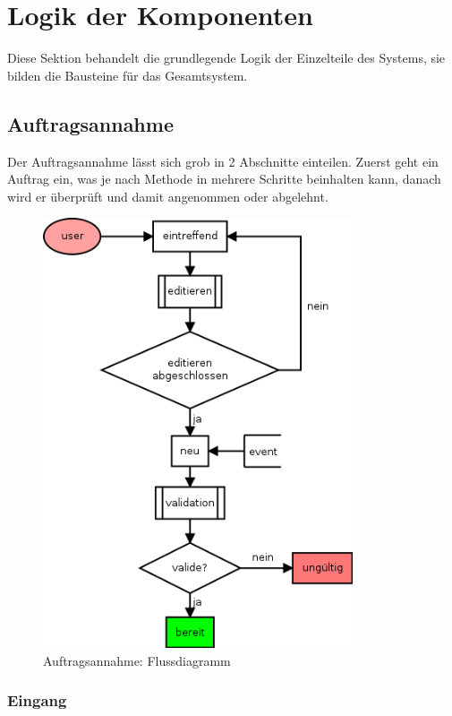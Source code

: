 \section{Logik der Komponenten}

Diese Sektion behandelt die grundlegende Logik  der Einzelteile des Systems,
sie bilden die Bausteine für das Gesamtsystem.


\subsection{Auftragsannahme}

Der Auftragsannahme lässt sich grob in 2 Abschnitte einteilen.
Zuerst geht ein Auftrag ein, was je nach Methode in mehrere Schritte beinhalten kann,
danach wird er überprüft und damit angenommen oder abgelehnt.


\begin{figure}[ht]
  \centering
  \label{fig:lebenszyklus-auftrag-eingang}
  \includegraphics[height=5in]{imageinput/lebenszyklus-auftrag-eingang.png}
  \caption{Auftragsannahme: Flussdiagramm}
\end{figure}


\subsubsection{Eingang}

